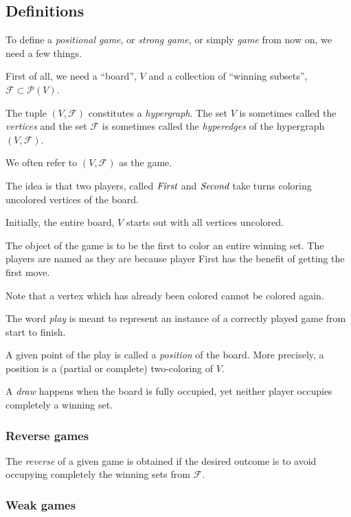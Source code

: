 \subsection{Definitions}

To define a \emph{positional game}, or \emph{strong game}, or simply \emph{game} from now on, we need a few things.

First of all, we need a ``board'', $V$ and a collection of ``winning subsets'', $\mathcal F \subset \mathcal P(V)$.

The tuple $(V,\mathcal F)$ constitutes a \emph{hypergraph}.
The set $V$ is sometimes called the \emph{vertices} and the set $\mathcal F$ is sometimes called the \emph{hyperedges} of the hypergraph $(V,\mathcal F)$.

\begin{remark}
We often refer to $(V,\mathcal F)$ as the game.
\end{remark}

The idea is that two players, called $\emph{First}$ and $\emph{Second}$ take turns coloring uncolored vertices of the board.

Initially, the entire board, $V$ starts out with all vertices uncolored.

The object of the game is to be the first to color an entire winning set.
The players are named as they are because player First has the benefit of getting the first move.

Note that a vertex which has already been colored cannot be colored again.

The word \emph{play} is meant to represent an instance of a correctly played game from start to finish.

A given point of the play is called a \emph{position} of the board.
More precisely, a position is a (partial or complete) two-coloring of $V$.

A \emph{draw} happens when the board is fully occupied, yet neither player occupies completely a winning set.

\subsubsection{Reverse games}

The \emph{reverse} of a given game is obtained if the desired outcome is to avoid occupying completely the winning sets from $\mathcal F$.

\subsubsection{Weak games}

